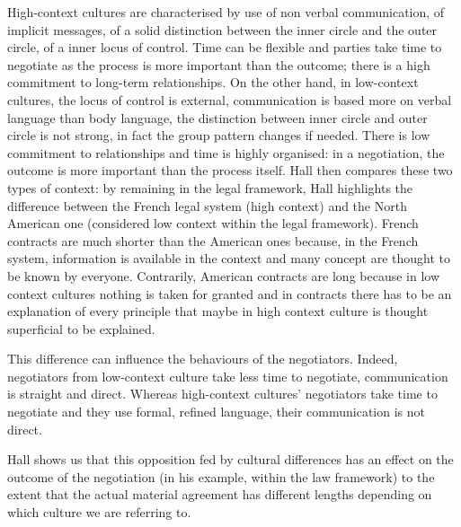 \documentclass[../main.tex]{subfiles}
\begin{document}
High-context cultures are characterised by use of non verbal communication, of implicit messages, of a solid distinction between the inner circle and the outer circle, of a inner locus of control. Time can be flexible and parties take time to negotiate as the process is more important than the outcome; there is a high commitment to long-term relationships. On the other hand, in low-context cultures, the locus of control is external, communication is based more on verbal language than body language, the distinction between inner circle and outer circle is not strong, in fact the group pattern changes if needed. There is low commitment to relationships and time is highly organised: in a negotiation, the outcome is more important than the process itself. Hall then compares these two types of context: by remaining in the legal framework, Hall highlights the difference between the French legal system (high context) and the North American one (considered low context within the legal framework). French contracts are much shorter than the American ones because, in the French system, information is available in the context and many concept are thought to be known by everyone. Contrarily, American contracts are long because in low context cultures nothing is taken for granted and in contracts there has to be an explanation of every principle that maybe in high context culture is thought superficial to be explained.

This difference can influence the behaviours of the negotiators. Indeed, negotiators from low-context culture take less time to negotiate, communication is straight and direct. Whereas high-context cultures' negotiators take time to negotiate and they use formal, refined language, their communication is not direct.

Hall shows us that this opposition fed by cultural differences has an effect on the outcome of the negotiation (in his example, within the law framework) to the extent that the actual material agreement has different lengths depending on which culture we are referring to.\\
\end{document}
